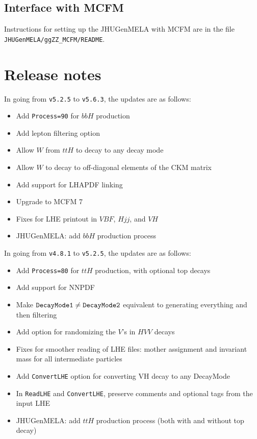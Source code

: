 \documentclass[aps,superscriptaddress,nofootinbib]{revtex4}
\begin{document}
\subsection{Interface with MCFM}

Instructions for setting up the JHUGenMELA with MCFM are in the file \verb|JHUGenMELA/ggZZ_MCFM/README|.


\section{ Release notes }

\noindent
In going from \verb|v5.2.5| to \verb|v5.6.3|, the updates are as follows:

\begin{itemize}
\item Add \verb|Process=90| for $bbH$ production
\item Add lepton filtering option
\item Allow $W$ from $ttH$ to decay to any decay mode
\item Allow $W$ to decay to off-diagonal elements of the CKM matrix
\item Add support for LHAPDF linking
\item Upgrade to MCFM 7
\item Fixes for LHE printout in $VBF$, $Hjj$, and $VH$
\item JHUGenMELA: add $bbH$ production process
\end{itemize}

\noindent
In going from \verb|v4.8.1| to \verb|v5.2.5|, the updates are as follows:

\begin{itemize}
\item Add \verb|Process=80| for $ttH$ production, with optional top decays
\item Add support for NNPDF
\item Make $\verb|DecayMode1|\ne\verb|DecayMode2|$ equivalent to generating everything and then filtering
\item Add option for randomizing the $V$'s in $HVV$ decays
\item Fixes for smoother reading of LHE files: mother assignment and invariant mass for all intermediate particles
\item Add \verb|ConvertLHE| option for converting VH decay to any DecayMode
\item In \verb|ReadLHE| and \verb|ConvertLHE|, preserve comments and optional tags from the input LHE
\item JHUGenMELA: add $ttH$ production process (both with and without top decay)
\end{itemize}
\end{document}
